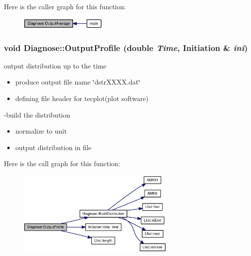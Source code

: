 Here is the caller graph for this function:\nopagebreak
\begin{figure}[H]
\begin{center}
\leavevmode
\includegraphics[width=122pt]{classDiagnose_dc46dd26362f94e09b956b3affa247c9_icgraph}
\end{center}
\end{figure}
\hypertarget{classDiagnose_db2f9991031fb8c301f44518c1d851ea}{
\subsubsection[{OutputProfile}]{\setlength{\rightskip}{0pt plus 5cm}void Diagnose::OutputProfile (double {\em Time}, \/  {\bf Initiation} \& {\em ini})}}
\label{classDiagnose_db2f9991031fb8c301f44518c1d851ea}


output distribution up to the time 



\begin{itemize}
\item produce output file name \char`\"{}dstrXXXX.dat\char`\"{}\end{itemize}


\begin{itemize}
\item defining file header for tecplot(plot software)\end{itemize}


-build the distribution

\begin{itemize}
\item normalize to unit\end{itemize}


\begin{itemize}
\item output distribution in file \end{itemize}


Here is the call graph for this function:\nopagebreak
\begin{figure}[H]
\begin{center}
\leavevmode
\includegraphics[width=221pt]{classDiagnose_db2f9991031fb8c301f44518c1d851ea_cgraph}
\end{center}
\end{figure}


